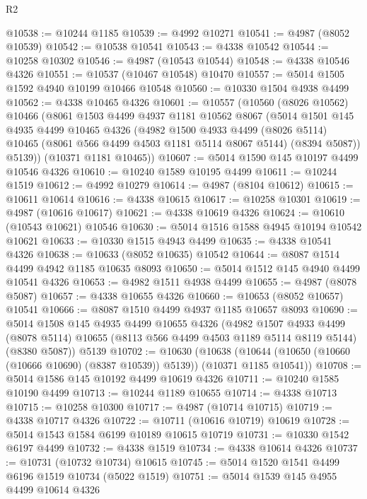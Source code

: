 \begin{lexlean}{R2}
\begin{coremodule}
@10538 := @10244 @1185
@10539 := @4992 @10271
@10541 := @4987 (@8052 @10539)
@10542 := @10538 @10541
@10543 := @4338 @10542
@10544 := @10258 @10302
@10546 := @4987 (@10543 @10544)
@10548 := @4338 @10546 @4326
@10551 := @10537 (@10467 @10548) @10470
@10557 := @5014 @1505 @1592 @4940 @10199 @10466 @10548
@10560 := @10330 @1504 @4938 @4499
@10562 := @4338 @10465 @4326
@10601 := @10557
    (@10560
      (@8026 @10562)
      @10466
      (@8061
        @1503
        @4499
        @4937
        @1181
        @10562
        @8067
        (@5014
          @1501
          @145
          @4935
          @4499
          @10465
          @4326
          (@4982
            @1500
            @4933
            @4499
            (@8026 @5114)
            @10465
            (@8061 @566 @4499 @4503 @1181 @5114 @8067 @5144)
            (@8394 @5087))
          @5139))
      (@10371 @1181 @10465))
@10607 := @5014 @1590 @145 @10197 @4499 @10546 @4326
@10610 := @10240 @1589 @10195 @4499
@10611 := @10244 @1519
@10612 := @4992 @10279
@10614 := @4987 (@8104 @10612)
@10615 := @10611 @10614
@10616 := @4338 @10615
@10617 := @10258 @10301
@10619 := @4987 (@10616 @10617)
@10621 := @4338 @10619 @4326
@10624 := @10610 (@10543 @10621) @10546
@10630 := @5014 @1516 @1588 @4945 @10194 @10542 @10621
@10633 := @10330 @1515 @4943 @4499
@10635 := @4338 @10541 @4326
@10638 := @10633 (@8052 @10635) @10542
@10644 := @8087 @1514 @4499 @4942 @1185 @10635 @8093
@10650 := @5014 @1512 @145 @4940 @4499 @10541 @4326
@10653 := @4982 @1511 @4938 @4499
@10655 := @4987 (@8078 @5087)
@10657 := @4338 @10655 @4326
@10660 := @10653 (@8052 @10657) @10541
@10666 := @8087 @1510 @4499 @4937 @1185 @10657 @8093
@10690 := @5014
    @1508
    @145
    @4935
    @4499
    @10655
    @4326
    (@4982
      @1507
      @4933
      @4499
      (@8078 @5114)
      @10655
      (@8113 @566 @4499 @4503 @1189 @5114 @8119 @5144)
      (@8380 @5087))
    @5139
@10702 := @10630
    (@10638 (@10644 (@10650 (@10660 (@10666 @10690) (@8387 @10539)) @5139)) (@10371 @1185 @10541))
@10708 := @5014 @1586 @145 @10192 @4499 @10619 @4326
@10711 := @10240 @1585 @10190 @4499
@10713 := @10244 @1189 @10655
@10714 := @4338 @10713
@10715 := @10258 @10300
@10717 := @4987 (@10714 @10715)
@10719 := @4338 @10717 @4326
@10722 := @10711 (@10616 @10719) @10619
@10728 := @5014 @1543 @1584 @6199 @10189 @10615 @10719
@10731 := @10330 @1542 @6197 @4499
@10732 := @4338 @1519
@10734 := @4338 @10614 @4326
@10737 := @10731 (@10732 @10734) @10615
@10745 := @5014 @1520 @1541 @4499 @6196 @1519 @10734 (@5022 @1519)
@10751 := @5014 @1539 @145 @4955 @4499 @10614 @4326

\end{coremodule}
\end{lexlean}
